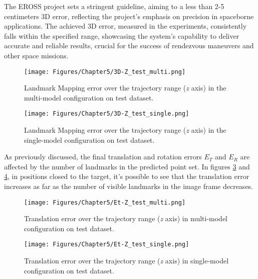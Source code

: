 The EROSS project \cite{eross} sets a stringent guideline, aiming to a less than 2-5 centimeters 3D error, reflecting the project's emphasis on precision in spaceborne applications. The achieved 3D error, measured in the experiments, consistently falls within the specified range, showcasing the system's capability to deliver accurate and reliable results, crucial for the success of rendezvous maneuvers and other space missions.

\begin{figure}[H]
    \centering
    \texttt{[image: Figures/Chapter5/3D-Z\_test\_multi.png]}
    \caption[Landmark Mapping error over the trajectory range in the multi-model configuration on test dataset.]{Landmark Mapping error over the trajectory range (\textit{z} axis) in the multi-model configuration on test dataset.}
    \label{fig:3D-Z test multi}
\end{figure}
\begin{figure}[H]
    \centering
    \texttt{[image: Figures/Chapter5/3D-Z\_test\_single.png]}
    \caption[Landmark Mapping error over the trajectory range in the single-model configuration on test dataset.]{Landmark Mapping error over the trajectory range (\textit{z} axis) in the single-model configuration on test dataset.}
    \label{fig:3D-Z test single}
\end{figure}
\newpage

As previously discussed, the final translation and rotation errors $E_T$ and $E_R$ are affected by the number of landmarks in the predicted point set. In figures \ref{fig:Et test multi} and \ref{fig:Et test single}, in positions closed to the target, it's possible to see that the translation error increases as far as the number of visible landmarks in the image frame decreases.\\

\begin{figure}[H]
    \centering
    \texttt{[image: Figures/Chapter5/Et-Z\_test\_multi.png]}
    \caption[Translation error over the trajectory range in multi-model configuration on test dataset.]{Translation error over the trajectory range (\textit{z} axis) in multi-model configuration on test dataset.}
    \label{fig:Et test multi}
\end{figure}
\begin{figure}[H]
    \centering
    \texttt{[image: Figures/Chapter5/Et-Z\_test\_single.png]}
    \caption[Translation error over the trajectory range in single-model configuration on test dataset.]{Translation error over the trajectory range (\textit{z} axis) in single-model configuration on test dataset.}
    \label{fig:Et test single}
\end{figure}

